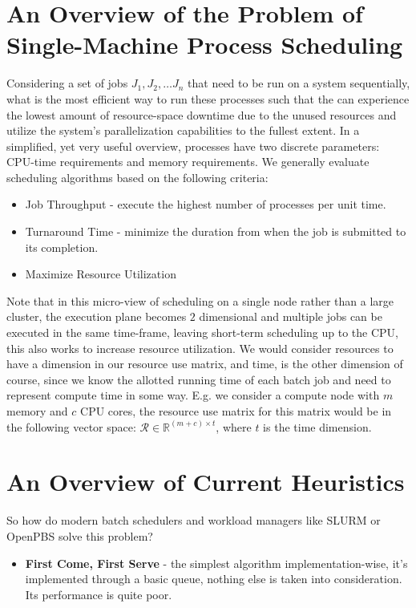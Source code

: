 \documentclass{article}
\begin{document}
\begin{spacing}{2.0}
\newpage
\section{An Overview of the Problem of Single-Machine Process Scheduling}

Considering a set of jobs $J_{1}, J_{2}, \dots J_{n}$ that need to be run on a system sequentially, what is the most efficient way to run these processes such that the can experience the lowest amount of resource-space downtime due to the unused resources and utilize the system's parallelization capabilities to the fullest extent. In a simplified, yet very useful overview, processes have two discrete parameters: CPU-time requirements and memory requirements. We generally evaluate scheduling algorithms based on the following criteria:

\begin{itemize}
    \item Job Throughput - execute the highest number of processes per unit time.
    \item Turnaround Time - minimize the duration from when the job is submitted to its completion.
    \item Maximize Resource Utilization
\end{itemize}

Note that in this micro-view of scheduling on a single node rather than a large cluster, the execution plane becomes $2$ dimensional and multiple jobs
can be executed in the same time-frame, leaving short-term scheduling up to the CPU, this also works to increase resource utilization. We would consider
resources to have a dimension in our resource use matrix, and time, is the other dimension of course, since we know the allotted running time of each batch
job and need to represent compute time in some way. E.g. we consider a compute node with $m$ memory and $c$ CPU cores, the resource use matrix for this
matrix would be in the following vector space: $\mathcal{R} \in \mathbb{R}^{(m + c) \times t}$, where $t$ is the time dimension.

\newpage
\section{An Overview of Current Heuristics}

So how do modern batch schedulers and workload managers like SLURM or OpenPBS solve this problem?

\begin{itemize}
    \item \textbf{First Come, First Serve} - the simplest algorithm implementation-wise, it's implemented through a basic queue, nothing else is taken into consideration.
    Its performance is quite poor.


\end{itemize}
\end{spacing}
\end{document}
